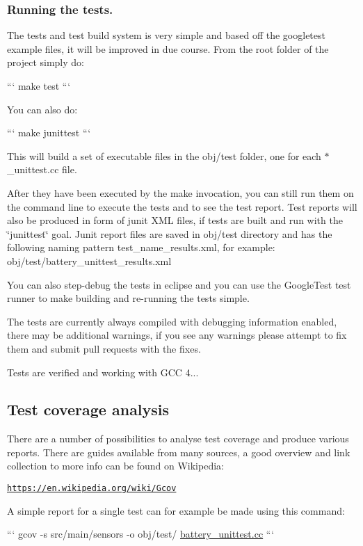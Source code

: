 \subsubsection*{Running the tests.}

The tests and test build system is very simple and based off the googletest example files, it will be improved in due course. From the root folder of the project simply do\+:

``` make test ```

You can also do\+:

``` make junittest ```

This will build a set of executable files in the {\ttfamily obj/test} folder, one for each {\ttfamily $\ast$\+\_\+unittest.cc} file.

After they have been executed by the make invocation, you can still run them on the command line to execute the tests and to see the test report. Test reports will also be produced in form of junit X\+M\+L files, if tests are built and run with the \char`\"{}junittest\char`\"{} goal. Junit report files are saved in obj/test directory and has the following naming pattern test\+\_\+name\+\_\+results.\+xml, for example\+: obj/test/battery\+\_\+unittest\+\_\+results.\+xml

You can also step-\/debug the tests in eclipse and you can use the Google\+Test test runner to make building and re-\/running the tests simple.

The tests are currently always compiled with debugging information enabled, there may be additional warnings, if you see any warnings please attempt to fix them and submit pull requests with the fixes.

Tests are verified and working with G\+C\+C 4...

\subsection*{Test coverage analysis}

There are a number of possibilities to analyse test coverage and produce various reports. There are guides available from many sources, a good overview and link collection to more info can be found on Wikipedia\+:

\href{https://en.wikipedia.org/wiki/Gcov}{\tt https\+://en.\+wikipedia.\+org/wiki/\+Gcov}

A simple report for a single test can for example be made using this command\+:

``` gcov -\/s src/main/sensors -\/o obj/test/ \hyperlink{battery__unittest_8cc}{battery\+\_\+unittest.\+cc} ```

